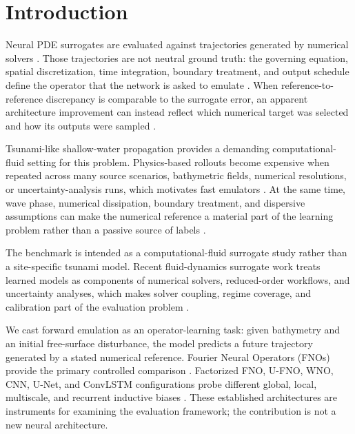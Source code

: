 \section{Introduction}
\setlength{\parskip}{0.5em}

Neural PDE surrogates are evaluated against trajectories generated by numerical solvers \citep{kovachki2023neuraloperator,takamoto2022pdebench}. Those trajectories are not neutral ground truth: the governing equation, spatial discretization, time integration, boundary treatment, and output schedule define the operator that the network is asked to emulate \citep{leveque2002finite,toro2009riemann,koehler2026emulator}. When reference-to-reference discrepancy is comparable to the surrogate error, an apparent architecture improvement can instead reflect which numerical target was selected and how its outputs were sampled \citep{koehler2026emulator}.

Tsunami-like shallow-water propagation provides a demanding computational-fluid setting for this problem. Physics-based rollouts become expensive when repeated across many source scenarios, bathymetric fields, numerical resolutions, or uncertainty-analysis runs, which motivates fast emulators \citep{leveque2011tsunami,berger2011geoclaw,wojcik2025aitsunami,surrogatePiso2026}. At the same time, wave phase, numerical dissipation, boundary treatment, and dispersive assumptions can make the numerical reference a material part of the learning problem rather than a passive source of labels \citep{leveque2002finite,berger2011geoclaw,shi2012boussinesq}.

The benchmark is intended as a computational-fluid surrogate study rather than a site-specific tsunami model. Recent fluid-dynamics surrogate work treats learned models as components of numerical solvers, reduced-order workflows, and uncertainty analyses, which makes solver coupling, regime coverage, and calibration part of the evaluation problem \citep{surrogatePiso2026,streetcanyon2026,romAdapt2026,fluidUQ2026}.

We cast forward emulation as an operator-learning task: given bathymetry and an initial free-surface disturbance, the model predicts a future trajectory generated by a stated numerical reference. Fourier Neural Operators (FNOs) provide the primary controlled comparison \citep{li2021fno}. Factorized FNO, U-FNO, WNO, CNN, U-Net, and ConvLSTM configurations probe different global, local, multiscale, and recurrent inductive biases \citep{tran2023ffno,wen2022ufno,tripura2023wno,lecun1998gradient,ronneberger2015unet,shi2015convlstm}. These established architectures are instruments for examining the evaluation framework; the contribution is not a new neural architecture.

